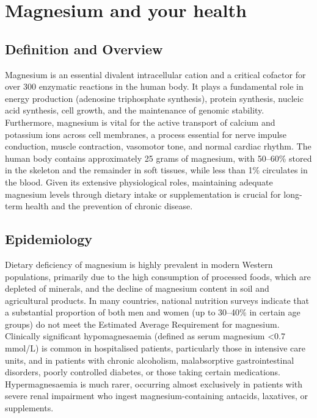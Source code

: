 \chapter{Magnesium and your health}

\section*{Definition and Overview}
Magnesium is an essential divalent intracellular cation and a critical cofactor for over 300 enzymatic reactions in the human body. It plays a fundamental role in energy production (adenosine triphosphate synthesis), protein synthesis, nucleic acid synthesis, cell growth, and the maintenance of genomic stability. Furthermore, magnesium is vital for the active transport of calcium and potassium ions across cell membranes, a process essential for nerve impulse conduction, muscle contraction, vasomotor tone, and normal cardiac rhythm. The human body contains approximately 25 grams of magnesium, with 50--60\% stored in the skeleton and the remainder in soft tissues, while less than 1\% circulates in the blood. Given its extensive physiological roles, maintaining adequate magnesium levels through dietary intake or supplementation is crucial for long-term health and the prevention of chronic disease.

\section*{Epidemiology}
Dietary deficiency of magnesium is highly prevalent in modern Western populations, primarily due to the high consumption of processed foods, which are depleted of minerals, and the decline of magnesium content in soil and agricultural products. In many countries, national nutrition surveys indicate that a substantial proportion of both men and women (up to 30--40\% in certain age groups) do not meet the Estimated Average Requirement for magnesium. Clinically significant hypomagnesaemia (defined as serum magnesium <0.7 mmol/L) is common in hospitalised patients, particularly those in intensive care units, and in patients with chronic alcoholism, malabsorptive gastrointestinal disorders, poorly controlled diabetes, or those taking certain medications. Hypermagnesaemia is much rarer, occurring almost exclusively in patients with severe renal impairment who ingest magnesium-containing antacids, laxatives, or supplements.

